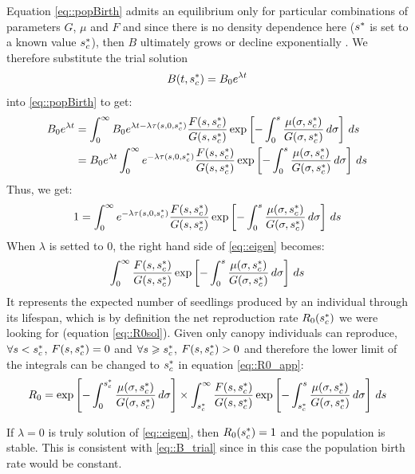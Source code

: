 \begin{refsection}
Equation \eqref{eq::popBirth} admits an equilibrium only for particular combinations of parameters $ G $, $ \mu $ and $ F $ and since there is no density dependence here ($ {s}^{*} $ is set to a known value $ {s}^{*}_c $), then $ B $ ultimately grows or decline exponentially \citep{DeRoos1997}. We therefore substitute the trial solution
\begin{equation} \label{eq::B_trial}
	B(t, {s}^{*}_c) = B_0e^{\lambda t}
\end{equation}
into \eqref{eq::popBirth} to get:
\begin{align*}
	B_0 e^{\lambda t} &= \int_{0}^{\infty} B_0 e^{\lambda t - \lambda \tau(s, 0, {s}^{*}_c)} \frac{F(s, {s}^{*}_c)}{G(s, {s}^{*}_c)} \exp \left[ -\int_{0}^{s} \frac{\mu(\sigma, {s}^{*}_c)}{G(\sigma, {s}^{*}_c)} \, d\sigma \right] \, ds \\
	&= B_0 e^{\lambda t} \int_{0}^{\infty} e^{- \lambda \tau(s, 0, {s}^{*}_c)} \frac{F(s, {s}^{*}_c)}{G(s, {s}^{*}_c)} \exp \left[ -\int_{0}^{s} \frac{\mu(\sigma, {s}^{*}_c)}{G(\sigma, {s}^{*}_c)} \, d\sigma \right] \, ds \\
\end{align*}
Thus, we get:
\begin{equation} \label{eq::eigen}
	1 = \int_{0}^{\infty} e^{- \lambda \tau(s, 0, {s}^{*}_c)} \frac{F(s, {s}^{*}_c)}{G(s, {s}^{*}_c)} \exp \left[ -\int_{0}^{s} \frac{\mu(\sigma, {s}^{*}_c)}{G(\sigma, {s}^{*}_c)} \, d\sigma \right] \, ds
\end{equation}
When $ \lambda $ is setted to 0, the right hand side of \eqref{eq::eigen} becomes:
\begin{equation} \label{eq::R0_app}
	\int_{0}^{\infty} \frac{F(s, {s}^{*}_c)}{G(s, {s}^{*}_c)} \exp \left[ -\int_{0}^{s} \frac{\mu(\sigma, {s}^{*}_c)}{G(\sigma, {s}^{*}_c)} \, d\sigma \right] \, ds
\end{equation}
It represents the expected number of seedlings produced by an individual through its lifespan, which is by definition the net reproduction rate $ R_0({s}^{*}_c) $ we were looking for (equation \eqref{eq::R0sol}). Given only canopy individuals can reproduce, $ \forall s < {s}^{*}_c $, $ F(s, {s}^{*}_c) = 0 $ and $ \forall s \geqslant {s}^{*}_c $, $ F(s, {s}^{*}_c) > 0 $ and therefore the lower limit of the integrals can be changed to $ {s}^{*}_c $ in equation \eqref{eq::R0_app}:
\[
	R_0 = \exp \left[- \int_{0}^{{s}^{*}_c} \frac{\mu(\sigma, {s}^{*}_c)}{G(\sigma, {s}^{*}_c)} \, d\sigma \right] \times \int_{{s}^{*}_c}^{\infty} \frac{F(s, {s}^{*}_c)}{G(s, {s}^{*}_c)} \exp \left[ - \int_{{s}^{*}_c}^{s} \frac{\mu(\sigma, {s}^{*}_c)}{G(\sigma, {s}^{*}_c)} \, d\sigma \right] \, ds
\]
\begin{rem}[On $ \lambda $]
	If $ \lambda = 0 $ is truly solution of \eqref{eq::eigen}, then $ R_0({s}^{*}_c) = 1 $ and the population is stable. This is consistent with \eqref{eq::B_trial} since in this case the population birth rate would be constant.
\end{rem}


\end{refsection}
